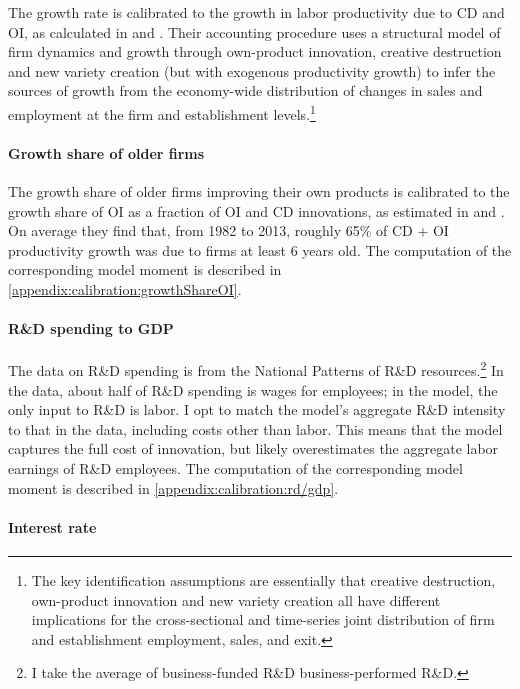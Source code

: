 \documentclass[ecta,nameyear,final]{econsocart}
\theoremstyle{plain}
\theoremstyle{remark}
\begin{document}
The growth rate is calibrated to the growth in labor productivity due to CD and OI, as calculated in \cite{garcia-macia_how_2019} and \cite{klenow_innovative_2020}. Their accounting procedure uses a structural model of firm dynamics and growth through own-product innovation, creative destruction and new variety creation (but with exogenous productivity growth) to infer the sources of growth from the economy-wide distribution of changes in sales and employment at the firm and establishment levels.\footnote{The key identification assumptions are essentially that creative destruction, own-product innovation and new variety creation all have different implications for the cross-sectional and time-series joint distribution of firm and establishment employment, sales, and exit.} 

\paragraph{Growth share of older firms}

The growth share of older firms improving their own products is calibrated to the growth share of OI as a fraction of OI and CD innovations, as estimated in \cite{garcia-macia_how_2019} and \cite{klenow_innovative_2020}. On average they find that, from 1982 to 2013, roughly 65\% of CD + OI productivity growth was due to firms at least 6 years old. The computation of the corresponding model moment is described in \ref{appendix:calibration:growthShareOI}.

\paragraph{R\&D spending to GDP}

The data on R\&D spending is from the National Patterns of R\&D resources.\footnote{I take the average of business-funded R\&D business-performed R\&D.} In the data, about half of R\&D spending is wages for employees; in the model, the only input to R\&D is labor. I opt to match the model's aggregate R\&D intensity to that in the data, including costs other than labor. This means that the model captures the full cost of innovation, but likely overestimates the aggregate labor earnings of R\&D employees. The computation of the corresponding model moment is described in \ref{appendix:calibration:rd/gdp}.

\paragraph{Interest rate}
\end{document}
